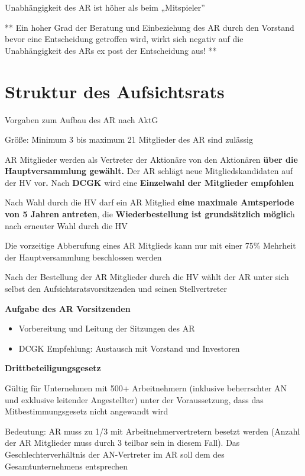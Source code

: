 \documentclass[
]{article}
\providecommand{\tightlist}{%
  \setlength{\itemsep}{0pt}\setlength{\parskip}{0pt}}
\begin{document}
Unabhängigkeit des AR ist höher als beim „Mitspieler''

** Ein hoher Grad der Beratung und Einbeziehung des AR durch den
Vorstand bevor eine Entscheidung getroffen wird, wirkt sich negativ auf
die Unabhängigkeit des ARs ex post der Entscheidung aus! **

\hypertarget{struktur-des-aufsichtsrats}{%
\section{Struktur des Aufsichtsrats}\label{struktur-des-aufsichtsrats}}

Vorgaben zum Aufbau des AR nach AktG

Größe: Minimum 3 bis maximum 21 Mitglieder des AR sind zulässig

AR Mitglieder werden als Vertreter der Aktionäre von den Aktionären
\textbf{über die Hauptversammlung gewählt. }Der AR schlägt neue
Mitgliedskandidaten auf der HV vor\textbf{. }Nach \textbf{DCGK }wird
eine\textbf{ Einzelwahl der Mitglieder empfohlen}

Nach Wahl durch die HV darf ein AR Mitglied \textbf{eine maximale
Amtsperiode von 5 Jahren antreten}, die \textbf{Wiederbestellung ist
grundsätzlich möglic}h nach erneuter Wahl durch die HV

Die vorzeitige Abberufung eines AR Mitglieds kann nur mit einer 75\%
Mehrheit der Hauptversammlung beschlossen werden

Nach der Bestellung der AR Mitglieder durch die HV wählt der AR unter
sich selbst den Aufsichtsratsvorsitzenden und seinen Stellvertreter

\textbf{Aufgabe des AR Vorsitzenden}

\begin{itemize}
\tightlist
\item
  Vorbereitung und Leitung der Sitzungen des AR
\item
  DCGK Empfehlung: Austausch mit Vorstand und Investoren
\end{itemize}

\textbf{Drittbeteiligungsgesetz}

Gültig für Unternehmen mit 500+ Arbeitnehmern (inklusive beherrschter AN
und exklusive leitender Angestellter) unter der Voraussetzung, dass das
Mitbestimmungsgesetz nicht angewandt wird

Bedeutung: AR muss zu 1/3 mit Arbeitnehmervertretern besetzt werden
(Anzahl der AR Mitglieder muss durch 3 teilbar sein in diesem Fall). Das
Geschlechterverhältnis der AN-Vertreter im AR soll dem des
Gesamtunternehmens entsprechen
\end{document}
